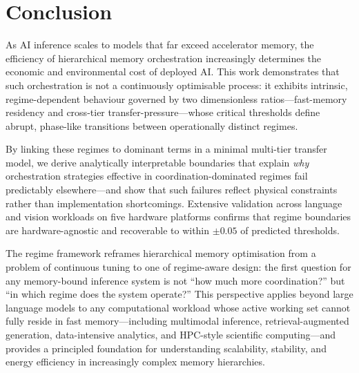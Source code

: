 \section{Conclusion}

As AI inference scales to models that far exceed accelerator memory, the
efficiency of hierarchical memory orchestration increasingly determines the
economic and environmental cost of deployed AI.
This work demonstrates that such orchestration is not a continuously
optimisable process: it exhibits intrinsic, regime-dependent behaviour governed
by two dimensionless ratios---fast-memory residency and cross-tier
transfer-pressure---whose critical thresholds define abrupt, phase-like
transitions between operationally distinct regimes.

By linking these regimes to dominant terms in a minimal multi-tier transfer
model, we derive analytically interpretable boundaries that explain \emph{why}
orchestration strategies effective in coordination-dominated regimes fail
predictably elsewhere---and show that such failures reflect physical constraints
rather than implementation shortcomings.
Extensive validation across language and vision workloads on five hardware
platforms confirms that regime boundaries are hardware-agnostic and recoverable
to within $\pm 0.05$ of predicted thresholds.

The regime framework reframes hierarchical memory optimisation from a problem
of continuous tuning to one of regime-aware design: the first question for any
memory-bound inference system is not ``how much more coordination?'' but ``in
which regime does the system operate?''
This perspective applies beyond large language models to any computational
workload whose active working set cannot fully reside in fast memory---including
multimodal inference, retrieval-augmented generation, data-intensive analytics,
and HPC-style scientific computing---and provides a principled foundation for
understanding scalability, stability, and energy efficiency in increasingly
complex memory hierarchies.
